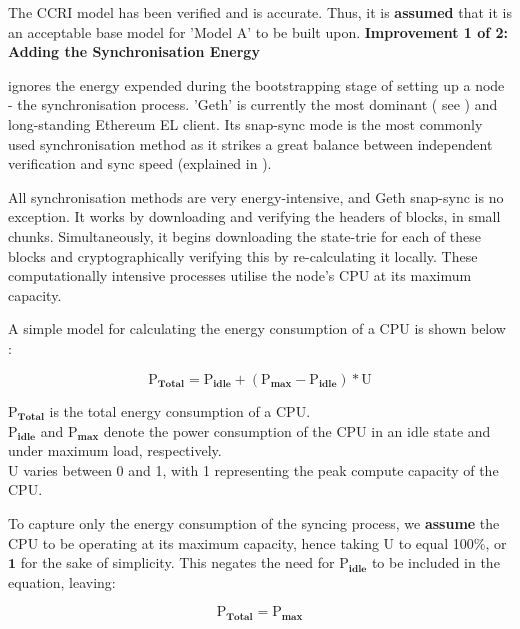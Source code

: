 The CCRI model has been verified and is accurate. Thus, it is \textbf{assumed}  that it is an acceptable base model for 'Model A' to be built upon.
\textbf{Improvement 1 of 2: Adding the Synchronisation Energy} 

  ignores the energy expended during the bootstrapping stage of setting up a node - the synchronisation process. 'Geth' is currently the most dominant ( see ) and long-standing Ethereum EL client. Its snap-sync mode is the most commonly used synchronisation method as it strikes a great balance between independent verification and sync speed (explained in ).

 All synchronisation methods are very energy-intensive, and Geth snap-sync is no exception. It works by downloading and verifying the headers of blocks, in small chunks. Simultaneously, it begins downloading the state-trie for each of these blocks and cryptographically verifying this by re-calculating it locally. These computationally intensive processes utilise the node's CPU at its maximum capacity.

A simple model for calculating the energy consumption of a CPU is shown below \cite{PelleyUnderstandingPower} :

\begin{equation*}
    \boldsymbol{\mathrm{P}_{Total} = \mathrm{P}_{idle} + \left({\mathrm{P}_{max} - \mathrm{P}_{idle}}\right) * \mathrm{U}}
\end{equation*}

$\boldsymbol{\mathrm{P}_{Total}}$ is the total energy consumption of a CPU.\\
$\boldsymbol{\mathrm{P}_{idle}}$ and $\boldsymbol{\mathrm{P}_{max}}$ denote the power consumption of the CPU in an idle state and under maximum load, respectively.\\
$\boldsymbol{\mathrm{U}}$ varies between 0 and 1, with 1 representing the peak compute capacity of the CPU.

To capture only the energy consumption of the syncing process, we \textbf{assume} the CPU to be operating at its maximum capacity, hence taking $\boldsymbol{\mathrm{U}}$ to equal 100\%, or $\boldsymbol{1}$ for the sake of simplicity. This negates the need for $\boldsymbol{\mathrm{P}_{idle}}$ to be included in the equation, leaving:

\begin{equation*}
    \boldsymbol{\mathrm{P}_{Total} = {\mathrm{P}_{max}}}
\end{equation*}

